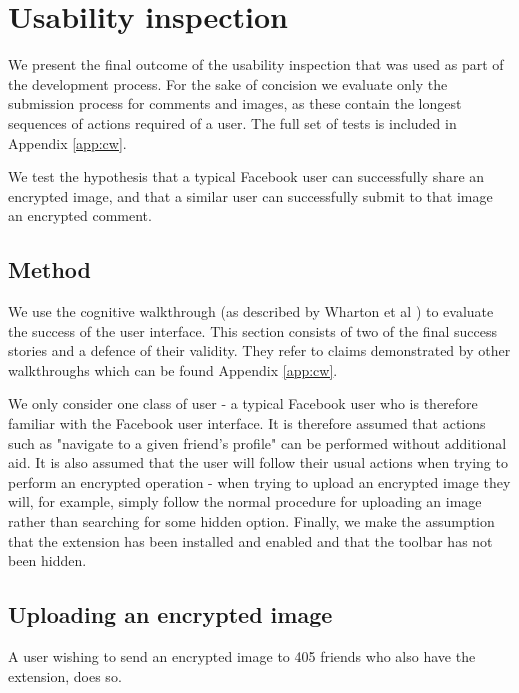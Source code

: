 \FloatBarrier
\section{Usability inspection}
\label{sec:cw}

We present the final outcome of the usability inspection that was used as part of the development process. For the sake of concision we evaluate only the submission process for comments and images, as these contain the longest sequences of actions required of a user. The full set of tests is included in Appendix \ref{app:cw}.

We test the hypothesis that a typical Facebook user can successfully share an encrypted image, and that a similar user can successfully submit to that image an encrypted comment.


\subsection{Method}

We use the cognitive walkthrough (as described by Wharton et al \cite{cogwalk}) to evaluate the success of the user interface. This section consists of two of the final success stories and a defence of their validity. They refer to claims demonstrated by other walkthroughs which can be found Appendix \ref{app:cw}.

We only consider one class of user - a typical Facebook user who is therefore familiar with the Facebook user interface. It is therefore assumed that actions such as "navigate to a given friend's profile" can be performed without additional aid. It is also assumed that the user will follow their usual actions when trying to perform an encrypted operation - when trying to upload an encrypted image they will, for example, simply follow the normal procedure for uploading an image rather than searching for some hidden option. Finally, we make the assumption that the extension has been installed and enabled and that the toolbar has not been hidden.


\subsection{Uploading an encrypted image}
A user wishing to send an encrypted image to 405 friends who also have the extension, does so.

